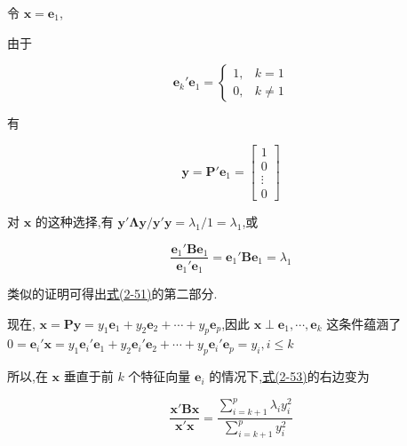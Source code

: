 令 $\bm{x} = \bm{e}_1$,

由于

\[
\bm{e}_k'\bm{e}_1 = \begin{cases} 1, & k = 1 \\ 0, & k \neq 1 \end{cases}
\]

有

\[
\bm{y} = \bm{P}'\bm{e}_1 = \begin{bmatrix} 1 \\ 0 \\ \vdots \\ 0 \end{bmatrix}
\]

对 $\bm{x}$ 的这种选择,有 $\bm{y}'\bm{\Lambda}\bm{y}/\bm{y}'\bm{y} = \lambda_1/1 = \lambda_1$,或

\label{eq:2-54}
\begin{equation}
\frac{\bm{e}_1'\bm{B}\bm{e}_1}{\bm{e}_1'\bm{e}_1} = \bm{e}_1'\bm{B}\bm{e}_1 = \lambda_1 \tag{2-54}
\end{equation}

类似的证明可得出\hyperref[eq:2-51]{式(2-51)}的第二部分.

现在, $\bm{x} = \bm{P}\bm{y} = y_1\bm{e}_1 + y_2\bm{e}_2 + \cdots + y_p\bm{e}_p$,因此 $\bm{x} \perp \bm{e}_1, \cdots, \bm{e}_k$ 这条件蕴涵了 $0 = \bm{e}_i'\bm{x} = y_1\bm{e}_i'\bm{e}_1 + y_2\bm{e}_i'\bm{e}_2 + \cdots + y_p\bm{e}_i'\bm{e}_p = y_i, i \leqslant k$

所以,在 $\bm{x}$ 垂直于前 $k$ 个特征向量 $\bm{e}_i$ 的情况下,\hyperref[eq:2-53]{式(2-53)}的右边变为

\[
\frac{\bm{x}'\bm{B}\bm{x}}{\bm{x}'\bm{x}} = \frac{\sum_{i=k+1}^{p}\lambda_i y_i^2}{\sum_{i=k+1}^{p}y_i^2}
\]
